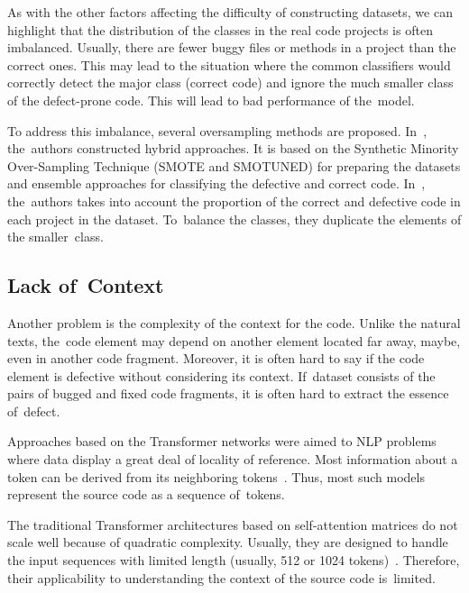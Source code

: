 \documentclass[mathematics,review,accept,moreauthors,pdftex]{Definitions/mdpi}
\begin{document}
\begin{paracol}{2}
\switchcolumn

As with the other factors affecting the difficulty of constructing datasets, we can highlight that the distribution of the classes in the real code projects is often imbalanced. Usually, there are fewer buggy files or methods in a project than the correct ones. This may lead to the situation where the common classifiers would correctly detect the major class (correct code) and ignore the much smaller class of the defect-prone code.
This will lead to bad performance of the~model.

To address this imbalance, several oversampling methods are proposed. \linebreak In~\cite{AlsawalqahEtAl2017,AgrawalMenzies2018}, the~authors constructed hybrid approaches. It is based on the Synthetic Minority Over-Sampling Technique (SMOTE and SMOTUNED) for preparing the datasets and ensemble approaches for classifying the defective and correct code.
In~\cite{ShiEtAl2020}, the~authors takes into account the proportion of the correct and defective code in each project in the dataset. To~balance the classes, they duplicate the elements of the smaller~class.

\subsection{Lack of~Context}

Another problem is the complexity of the context for the code. Unlike the natural texts, the~code element may depend on another element located far away, maybe, even in another code fragment. Moreover, it is often hard to say if the code element is defective without considering its context. If~dataset consists of the pairs of bugged and fixed code fragments, it is often hard to extract the essence of~defect.

Approaches based on the Transformer networks were aimed to NLP problems where data display a great deal of locality of reference. Most information about a token can be derived from its neighboring tokens~\cite{ tay2020efficient}. Thus, most such models represent the source code as a sequence of~tokens.

The traditional Transformer architectures based on self-attention matrices do not scale well because of quadratic complexity. Usually, they are designed to handle the input sequences with limited length (usually, 512 or 1024 tokens)~\cite{tay2020efficient, tay2020long}.
 Therefore, their applicability to understanding the context of the source code is~limited.
 

\end{paracol}
\end{document}
